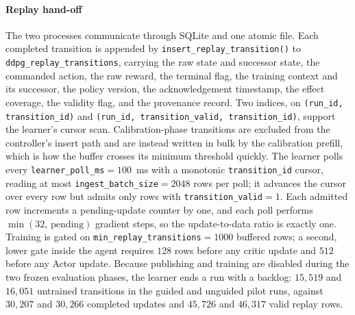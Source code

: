 \paragraph*{Replay hand-off}
The two processes communicate through SQLite and one atomic file. Each completed transition is appended by \texttt{insert\_replay\_transition()} to \texttt{ddpg\_replay\_transitions}, carrying the raw state and successor state, the commanded action, the raw reward, the terminal flag, the training context and its successor, the policy version, the acknowledgement timestamp, the effect coverage, the validity flag, and the provenance record. Two indices, on \texttt{(run\_id, transition\_id)} and \texttt{(run\_id, transition\_valid, transition\_id)}, support the learner's cursor scan. Calibration-phase transitions are excluded from the controller's insert path and are instead written in bulk by the calibration prefill, which is how the buffer crosses its minimum threshold quickly. The learner polls every \texttt{learner\_poll\_ms}${}=100$~ms with a monotonic \texttt{transition\_id} cursor, reading at most \texttt{ingest\_batch\_size}${}=2048$ rows per poll; it advances the cursor over every row but admits only rows with \texttt{transition\_valid}${}=1$. Each admitted row increments a pending-update counter by one, and each poll performs $\min(32,\,\text{pending})$ gradient steps, so the update-to-data ratio is exactly one. Training is gated on \texttt{min\_replay\_transitions}${}=1000$ buffered rows; a second, lower gate inside the agent requires $128$ rows before any critic update and $512$ before any Actor update. Because publishing and training are disabled during the two frozen evaluation phases, the learner ends a run with a backlog: $15{,}519$ and $16{,}051$ untrained transitions in the guided and unguided pilot runs, against $30{,}207$ and $30{,}266$ completed updates and $45{,}726$ and $46{,}317$ valid replay rows.

